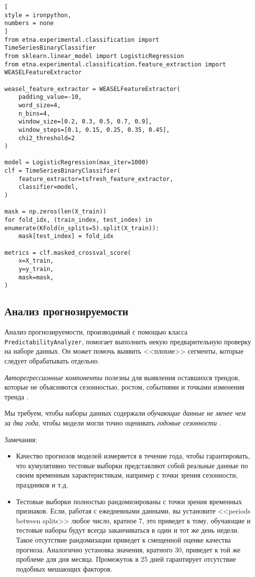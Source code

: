 \documentclass[%
	11pt,
	a4paper,
	utf8,
		]{article}
\begin{document}
\begin{lstlisting}[
style = ironpython,
numbers = none
]
from etna.experimental.classification import TimeSeriesBinaryClassifier
from sklearn.linear_model import LogisticRegression
from etna.experimental.classification.feature_extraction import WEASELFeatureExtractor

weasel_feature_extractor = WEASELFeatureExtractor(
    padding_value=-10,
    word_size=4,
    n_bins=4,
    window_size=[0.2, 0.3, 0.5, 0.7, 0.9],
    window_steps=[0.1, 0.15, 0.25, 0.35, 0.45],
    chi2_threshold=2
)

model = LogisticRegression(max_iter=1000)
clf = TimeSeriesBinaryClassifier(
    feature_extractor=tsfresh_feature_extractor,
    classifier=model,
)

mask = np.zeros(len(X_train))
for fold_idx, (train_index, test_index) in enumerate(KFold(n_splits=5).split(X_train)):
    mask[test_index] = fold_idx
    
metrics = clf.masked_crossval_score(
    x=X_train,
    y=y_train,
    mask=mask,
)
\end{lstlisting}

\subsection{Анализ прогнозируемости}

Анализ прогнозируемости, производимый с помощью класса \verb|PredictabilityAnalyzer|, помогает выполнить некую предварительную проверку на наборе данных. Он может помочь выявить <<плохие>> сегменты, которые следует обрабатывать отдельно.

\emph{Авторегрессионные компоненты} полезны для выявления оставшихся трендов, которые не объясняются сезонностью, ростом, событиями и точками изменения тренда \cite[]{gruzdev:time-series-2022}.

Мы требуем, чтобы наборы данных содержали \emph{\color{blue}обучающие данные не менее чем за два года}, чтобы модели могли точно оценивать \emph{годовые сезонности} \cite[]{gruzdev:time-series-2022}.

Замечания:
\begin{itemize}
	\item Качество прогнозов моделей измеряется в течение года, чтобы гарантировать, что кумулятивно тестовые выборки представляют собой реальные данные по своим временным характеристикам, например с точки зрения сезонности, праздников и т.д. 
	
	\item Тестовые выборки полностью рандомизированы с точки зрения временных признаков. Если, работая с ежедневными данными, вы установите <<periods between splits>> любое число, кратное 7, это приведет к тому, обучающие и тестовые наборы будут всегда заканчиваться в один и тот же день недели. Такое отсутствие рандомизации приведет к смещенной оценке качества прогноза. Аналогично установка значения, кратного 30, приведет к той же проблеме для дня месяца. Промежуток в 25 дней гарантирует отсутствие подобных мешающих факторов.
\end{itemize}
\end{document}
